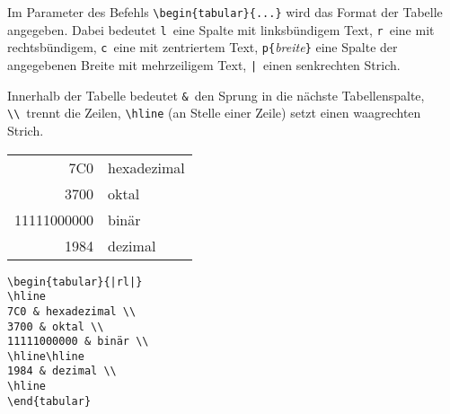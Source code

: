 Im Parameter des Befehls \verb|\begin{tabular}{...}| wird das
Format der Tabelle angegeben.
Dabei bedeutet
\texttt{l}~eine Spalte mit linksbündigem Text,
\texttt{r}~eine mit rechtsbündigem,
\texttt{c}~eine mit zentriertem Text,
\verb|p{|\textit{breite}\verb|}| eine Spalte der angegebenen
Breite mit mehrzeiligem Text,
\verb.|.~einen senkrechten Strich.
 
Innerhalb der Tabelle bedeutet
\verb|&|~den Sprung in die nächste Tabellenspalte,
\verb|\\|~trennt die Zeilen,
\verb|\hline| (an Stelle einer Zeile) setzt einen waagrechten
Strich.
 
          \vspace{0pt plus 1cm}
\exa
\begin{tabular}[t]{|rl|}
\hline
7C0 & hexadezimal \\
3700 & oktal \\
11111000000 & binär \\
\hline\hline
1984 & dezimal \\
\hline
\end{tabular}
\exb
\begin{verbatim}
\begin{tabular}{|rl|}
\hline
7C0 & hexadezimal \\
3700 & oktal \\
11111000000 & binär \\
\hline\hline
1984 & dezimal \\
\hline
\end{tabular}
\end{verbatim}
\exc
 
\endinput
